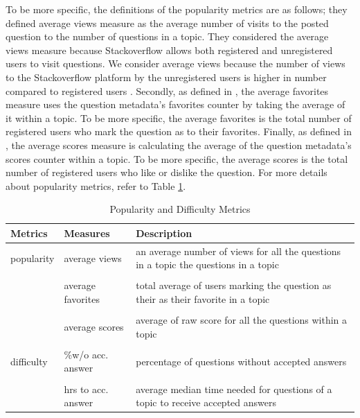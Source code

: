 To be more specific, the definitions of the popularity metrics are as follows; they defined average views measure \cite{bajaj2014mining, nadi2016jumping, rosen2016mobile, yang2016security} as the average number of visits to the posted question to the number of questions in a topic. They considered the average views measure because Stackoverflow allows both registered and unregistered users to visit questions. We consider average views because the number of views to the Stackoverflow platform by the unregistered users is higher in number compared to registered users \cite{mamykina2011design}. Secondly, as defined in \cite{bajaj2014mining, nadi2016jumping, pinto2015study, yang2016security}, the average favorites measure uses the question metadata’s favorites counter by taking the average of it within a topic. To be more specific, the average favorites is the total number of registered users who mark the question as to their favorites. Finally, as defined in \cite{bajaj2014mining, nadi2016jumping, pinto2015study, yang2016security}, the average scores measure is calculating the average of the question metadata’s scores counter within a topic. To be more specific, the average scores is the total number of registered users who like or dislike the question. For more details about popularity metrics, refer to Table \ref{PM}.

\begin{table}[h!tb]
\caption{Popularity and Difficulty Metrics}
\label{PM}
\centering
\begin{tabular}{p{0.70in}p{1.20in}p{3.60in}} \hline
\textbf{Metrics} & \textbf{Measures} & \textbf{Description}\\ \hline
popularity & average views & an average number of views for all the questions in a topic the questions in a topic \\
\\
& average favorites & total average of users marking the question as their as their favorite in a topic \\
\\
& average scores & average of raw score for all the questions within a topic \\
\\
difficulty & \%w/o acc. answer & percentage of questions without accepted answers \\
\\
& hrs to acc. answer & average median time needed for questions of a topic to receive accepted answers\\ \hline
\end{tabular}
\end{table}

